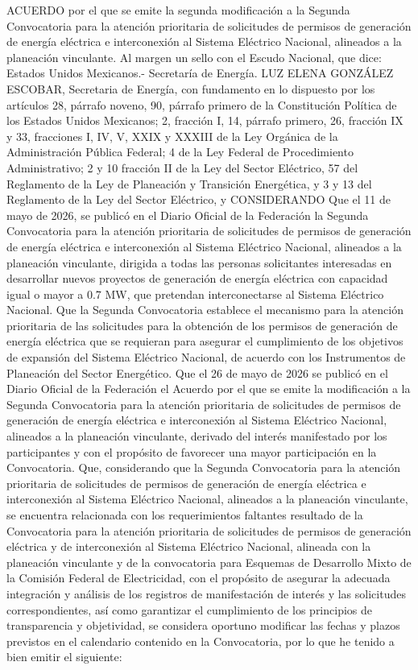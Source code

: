 \begingroup
\senertexto
ACUERDO por el que se emite la segunda modificación a la Segunda Convocatoria para la atención prioritaria de solicitudes de permisos de generación de energía eléctrica e interconexión al Sistema Eléctrico Nacional, alineados a la planeación vinculante.
Al margen un sello con el Escudo Nacional, que dice: Estados Unidos Mexicanos.- Secretaría de Energía.
LUZ ELENA GONZÁLEZ ESCOBAR, Secretaria de Energía, con fundamento en lo dispuesto por los artículos 28, párrafo noveno, 90, párrafo primero de la Constitución Política de los Estados Unidos Mexicanos; 2, fracción I, 14, párrafo primero, 26, fracción IX y 33, fracciones I, IV, V, XXIX y XXXIII de la Ley Orgánica de la Administración Pública Federal; 4 de la Ley Federal de Procedimiento Administrativo; 2 y 10 fracción II de la Ley del Sector Eléctrico, 57 del Reglamento de la Ley de Planeación y Transición Energética, y 3 y 13 del Reglamento de la Ley del Sector Eléctrico, y
CONSIDERANDO
Que el 11 de mayo de 2026, se publicó en el Diario Oficial de la Federación la Segunda Convocatoria para la atención prioritaria de solicitudes de permisos de generación de energía eléctrica e interconexión al Sistema Eléctrico Nacional, alineados a la planeación vinculante, dirigida a todas las personas solicitantes interesadas en desarrollar nuevos proyectos de generación de energía eléctrica con capacidad igual o mayor a 0.7 MW, que pretendan interconectarse al Sistema Eléctrico Nacional.
Que la Segunda Convocatoria establece el mecanismo para la atención prioritaria de las solicitudes para la obtención de los permisos de generación de energía eléctrica que se requieran para asegurar el cumplimiento de los objetivos de expansión del Sistema Eléctrico Nacional, de acuerdo con los Instrumentos de Planeación del Sector Energético.
Que el 26 de mayo de 2026 se publicó en el Diario Oficial de la Federación el Acuerdo por el que se emite la modificación a la Segunda Convocatoria para la atención prioritaria de solicitudes de permisos de generación de energía eléctrica e interconexión al Sistema Eléctrico Nacional, alineados a la planeación vinculante, derivado del interés manifestado por los participantes y con el propósito de favorecer una mayor participación en la Convocatoria.
Que, considerando que la Segunda Convocatoria para la atención prioritaria de solicitudes de permisos de generación de energía eléctrica e interconexión al Sistema Eléctrico Nacional, alineados a la planeación vinculante, se encuentra relacionada con los requerimientos faltantes resultado de la Convocatoria para la atención prioritaria de solicitudes de permisos de generación eléctrica y de interconexión al Sistema Eléctrico Nacional, alineada con la planeación vinculante y de la convocatoria para Esquemas de Desarrollo Mixto de la Comisión Federal de Electricidad, con el propósito de asegurar la adecuada integración y análisis de los registros de manifestación de interés y las solicitudes correspondientes, así como garantizar el cumplimiento de los principios de transparencia y objetividad, se considera oportuno modificar las fechas y plazos previstos en el calendario contenido en la Convocatoria, por lo que he tenido a bien emitir el siguiente:
